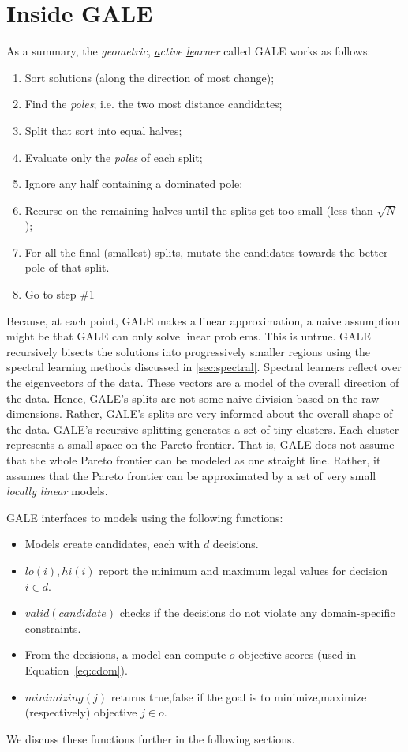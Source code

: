 \documentclass[10pt,journal,compsoc]{IEEEtran}
\newcommand{\eq}[1]{Equation~\ref{eq:#1}}
\newcommand{\bi}{\begin{itemize}}
\newcommand{\ei}{\end{itemize}}
\newcommand{\be}{\begin{enumerate}}
\newcommand{\ee}{\end{enumerate}}
\newcommand{\tion}[1]{\textsection\ref{sec:#1}}
\newenvironment{changed}{\par}{\par}
\begin{document}
\section{Inside GALE}

As a summary, the  {\em \underline{g}eometric}, {\em \underline{a}ctive \underline{le}arner} called GALE works as follows:
\begin{changed}
\be
\item Sort solutions (along the direction of most change);
\item Find the {\em poles}; i.e. the two most distance candidates;
\item Split that sort into equal halves;
\item Evaluate only the {\em poles} of each split;
\item Ignore any half containing a dominated pole;
\item Recurse on the remaining halves until the splits get too small (less than $\sqrt{N}$);
\item For all the final (smallest) splits,
  mutate the candidates towards the better pole of
  that split. 
\item Go to step \#1 \ee 
\end{changed}
\noindent

Because, at each point, GALE makes a linear approximation, a naive assumption might be that GALE can only solve linear problems.
This is untrue.
GALE recursively bisects the solutions into progressively smaller regions using the spectral learning methods discussed in \tion{spectral}. Spectral learners reflect over the eigenvectors of the data.
These vectors are a model of the overall direction of the data.  
Hence, GALE's splits are not some naive division based on the raw dimensions. 
Rather, GALE's splits are very informed about the overall shape of the data. 
GALE's recursive splitting generates a set of tiny clusters. Each cluster represents a small space on the Pareto frontier.  
That is, GALE does not assume that the whole Pareto frontier can be modeled as one straight line. 
Rather, it assumes that the Pareto frontier can be approximated by a set of very small {\em locally linear} models.

GALE interfaces to models using the following functions:
\bi
\item Models create candidates, each  with $d$ decisions. 
\item $\mathit{lo}(i), \mathit{hi}(i)$ report the minimum and maximum
legal values for decision $i\in d$.
\item $\mathit{valid}(\mathit{candidate})$ 
checks if the decisions
do not violate any domain-specific constraints.
\item  From the decisions,
a model can compute $o$  objective scores (used in \eq{cdom}).
\item $\mathit{minimizing}(j)$ returns true,false if the goal
is to minimize,maximize (respectively) objective $j \in o$.
\ei
We discuss these functions further in the following sections.
\end{document}

